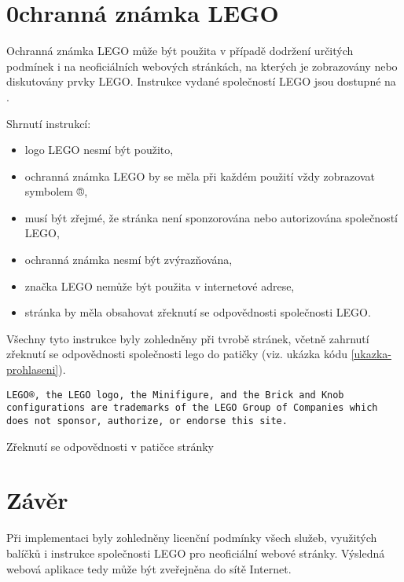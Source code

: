 \section{0chranná známka LEGO}
Ochranná známka LEGO může být použita v případě dodržení určitých podmínek i na neoficiálních webových stránkách, na kterých je zobrazovány nebo diskutovány prvky LEGO. Instrukce vydané společností LEGO jsou dostupné na \autocite{lego:fair-play}.

Shrnutí instrukcí: 
\begin{itemize}
        \item logo LEGO nesmí být použito,
        \item ochranná známka LEGO by se měla při každém použití vždy zobrazovat symbolem ®,
        \item musí být zřejmé, že stránka není sponzorována nebo autorizována společností LEGO,
        \item ochranná známka nesmí být zvýrazňována,
        \item značka LEGO nemůže být použita v internetové adrese,
        \item stránka by měla obsahovat zřeknutí se odpovědnosti společnosti LEGO.
\end{itemize}

Všechny tyto instrukce byly zohledněny při tvrobě stránek, včetně zahrnutí zřeknutí se odpovědnosti společnosti lego do patičky (viz. ukázka kódu \ref{ukazka-prohlaseni}).

\begin{listing}[htbp]
        \begin{verbatim}
LEGO®, the LEGO logo, the Minifigure, and the Brick and Knob 
configurations are trademarks of the LEGO Group of Companies which
does not sponsor, authorize, or endorse this site.
        \end{verbatim}
    \caption{Zřeknutí se odpovědnosti v patičce stránky\label{ukazka-prohlaseni}}
\end{listing}

\section{Závěr}
Při implementaci byly zohledněny licenční podmínky všech služeb, využitých balíčků i instrukce společnosti LEGO pro neoficiální webové stránky. Výsledná webová aplikace tedy může být zveřejněna do sítě Internet.